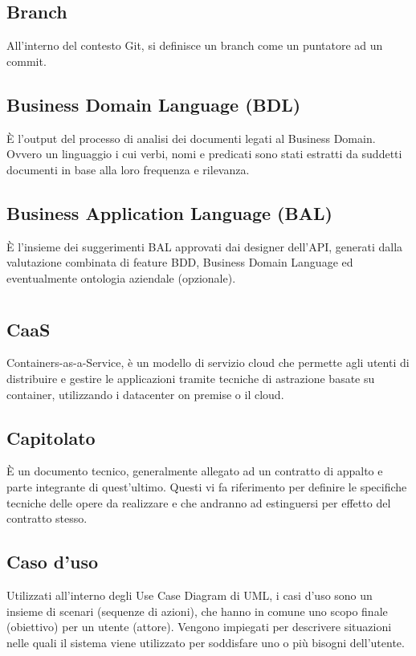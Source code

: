 	\subsection*{Branch}
	All’interno del contesto Git, si definisce un branch come un puntatore ad un commit.
	\subsection*{Business Domain Language (BDL)}
	È l'output del processo di analisi dei documenti legati al Business Domain. Ovvero un linguaggio i cui verbi, nomi e predicati sono stati estratti da suddetti documenti in base alla loro frequenza e rilevanza.
	\subsection*{Business Application Language (BAL)}
	È l’insieme dei suggerimenti BAL approvati dai designer dell’API, generati dalla valutazione combinata di feature BDD, Business Domain Language ed eventualmente ontologia aziendale (opzionale).
\pagebreak
\section[C]{}
	\subsection*{CaaS}
	Containers-as-a-Service, è un modello di servizio cloud che permette agli utenti di distribuire e gestire le applicazioni tramite tecniche di astrazione basate su container, utilizzando i datacenter on premise o il cloud.
	\subsection*{Capitolato}
	È un documento tecnico, generalmente allegato ad un contratto di appalto e parte integrante di quest’ultimo. Questi vi fa riferimento per definire le specifiche tecniche delle opere da realizzare e che andranno ad estinguersi per effetto del contratto stesso.
	\subsection*{Caso d'uso}
	Utilizzati all’interno degli Use Case Diagram di UML, i casi d’uso sono un insieme di scenari (sequenze di azioni), che hanno in comune uno scopo finale (obiettivo) per un utente (attore). Vengono impiegati per descrivere situazioni nelle quali il sistema viene utilizzato per soddisfare uno o più bisogni dell’utente.
